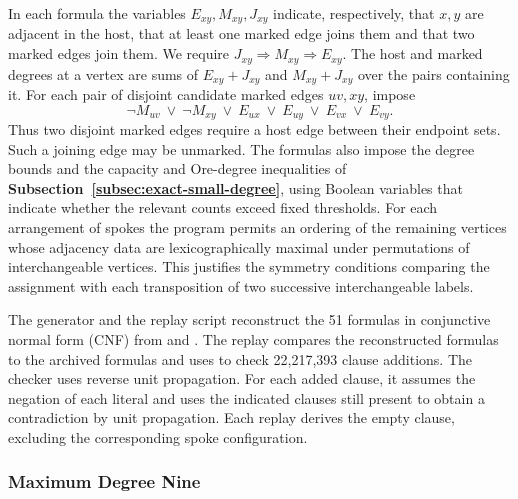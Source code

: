 \documentclass[preprint,11pt,numbers]{elsarticle-arxiv}
\numberwithin{equation}{section}
\theoremstyle{definition}
\begin{document}
In each formula the variables $E_{xy},M_{xy},J_{xy}$
indicate, respectively, that $x,y$ are adjacent in the host,
that at least one marked edge joins them and that two marked edges
join them. We require
$J_{xy}\Rightarrow M_{xy}\Rightarrow E_{xy}$. The host
and marked degrees at a vertex are sums of $E_{xy}+J_{xy}$
and $M_{xy}+J_{xy}$ over the pairs containing it. For each
pair of disjoint candidate marked edges $uv,xy$, impose
\begin{equation}\label{eq:multi-sat-witness}
 \neg M_{uv}\ \lor\ \neg M_{xy}\ \lor\
 E_{ux}\ \lor\ E_{uy}\ \lor\ E_{vx}\ \lor\ E_{vy}.
\end{equation}
Thus two disjoint marked edges require a host edge between their
endpoint sets. Such a joining edge may be unmarked. The
formulas also impose the degree bounds and the capacity and
Ore-degree inequalities of \textbf{Subsection~\ref{subsec:exact-small-degree}}, using Boolean variables that
indicate whether the relevant counts exceed fixed
thresholds.
For each arrangement of spokes the program permits an ordering of the
remaining vertices whose adjacency data are lexicographically maximal
under permutations of interchangeable vertices. This justifies the
symmetry conditions comparing the assignment with each transposition
of two successive interchangeable labels.

The generator  and the replay
script  reconstruct the
51 formulas in conjunctive normal form (CNF) from
 and
. The replay compares the
reconstructed formulas to the archived formulas and uses
 to check 22,217,393 clause additions.
The checker uses reverse unit propagation. For each added
clause, it assumes the negation of each literal and uses
the indicated clauses still present to obtain a
contradiction by unit propagation. Each replay derives
the empty clause, excluding the corresponding spoke
configuration.

\subsubsection{Maximum Degree Nine}\label{app:multi-nine}
\end{document}
